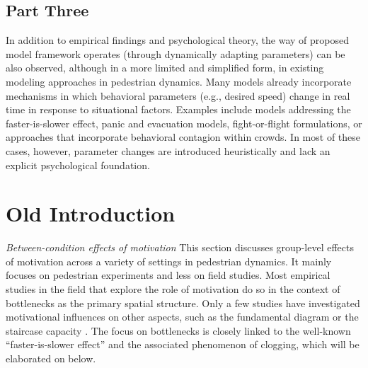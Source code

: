 \documentclass[pdflatex,sn-mathphys-num]{sn-jnl}%
\theoremstyle{thmstyleone}%
\theoremstyle{thmstyletwo}%
\theoremstyle{thmstylethree}%
\begin{document}
\subsection{Part Three} 



In addition to empirical findings and psychological theory, the way of proposed model framework operates (through dynamically adapting parameters) can be also observed, although in a more limited and simplified form, in existing modeling approaches in pedestrian dynamics. Many models already incorporate mechanisms in which behavioral parameters (e.g., desired speed) change in real time in response to situational factors. Examples include models addressing the faster-is-slower effect, panic and evacuation models, fight-or-flight formulations, or approaches that incorporate behavioral contagion within crowds. In most of these cases, however, parameter changes are introduced heuristically and lack an explicit psychological foundation.








\section{Old Introduction}\label{sec1}





\textit{Between-condition effects of motivation}
This section discusses group-level effects of motivation across a variety of settings in pedestrian dynamics. It mainly focuses on pedestrian experiments and less on field studies. Most empirical studies in the field that explore the role of motivation do so in the context of bottlenecks as the primary spatial structure. Only a few studies have investigated motivational influences on other aspects, such as the fundamental diagram \cite{ye_pedestrian_2021} %
or the staircase capacity \cite{graat_complex_1999}. The focus on bottlenecks is closely linked to the well-known “faster-is-slower effect” and the associated phenomenon of clogging, which will be elaborated on below.
\end{document}
